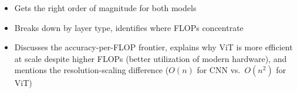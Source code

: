 \begin{interviewq}

\goodgreat
\begin{itemize}
    \item {} Gets the right order of magnitude for both models
    \item {} Breaks down by layer type, identifies where FLOPs concentrate
    \item {} Discusses the accuracy-per-FLOP frontier, explains why ViT is more efficient at scale despite higher FLOPs (better utilization of modern hardware), and mentions the resolution-scaling difference ($O(n)$ for CNN vs.\ $O(n^2)$ for ViT)
\end{itemize}

\end{interviewq}

